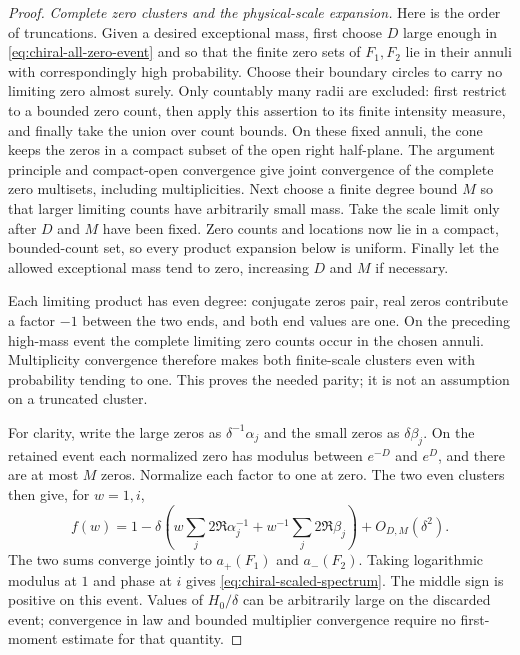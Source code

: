 \begin{proof}
\smallskip\noindent
\emph{Complete zero clusters and the physical-scale expansion.}
Here is the order of truncations. Given a desired exceptional mass, first
choose $D$ large enough in \eqref{eq:chiral-all-zero-event} and so that
the finite zero sets of $F_1,F_2$ lie in their annuli with correspondingly
high probability. Choose their boundary circles to carry no limiting zero
almost surely. Only countably many radii are excluded: first restrict to
a bounded zero count, then apply this assertion to its finite intensity
measure, and finally take the union over count bounds. On these fixed
annuli, the cone keeps the zeros in a compact subset of the open right
half-plane. The argument principle and compact-open convergence give joint
convergence of the complete zero multisets, including multiplicities.
Next choose a finite degree bound $M$ so that larger limiting counts have
arbitrarily small mass. Take the scale limit only after $D$ and $M$ have
been fixed. Zero counts and locations now lie in a compact, bounded-count
set, so every product expansion below is uniform. Finally let the allowed
exceptional mass tend to zero, increasing $D$ and $M$ if necessary.

Each limiting product has even degree: conjugate zeros pair, real zeros
contribute a factor $-1$ between the two ends, and both end values are one.
On the preceding high-mass event the complete limiting zero counts occur
in the chosen annuli. Multiplicity convergence therefore makes both
finite-scale clusters even with probability tending to one. This proves
the needed parity; it is not an assumption on a truncated cluster.

For clarity, write the large zeros as $\delta^{-1}\alpha_j$ and the
small zeros as $\delta\beta_j$. On the retained event each normalized
zero has modulus between $e^{-D}$ and $e^D$, and there are at most $M$
zeros. Normalize each factor to one at zero. The two even clusters then
give, for $w=1,i$,
\begin{equation}\label{eq:chiral-product-expansion}
 f(w)=1-\delta\left(
       w\sum_j2\Re\alpha_j^{-1}
          +w^{-1}\sum_j2\Re\beta_j\right)+O_{D,M}(\delta^2).
\end{equation}
The two sums converge jointly to $a_+(F_1)$ and $a_-(F_2)$.
Taking logarithmic modulus at $1$ and phase at $i$ gives
\eqref{eq:chiral-scaled-spectrum}. The middle sign is positive on this
event. Values of $H_0/\delta$ can be arbitrarily large on the discarded
event; convergence in law and bounded multiplier convergence require no
first-moment estimate for that quantity.


\end{proof}
